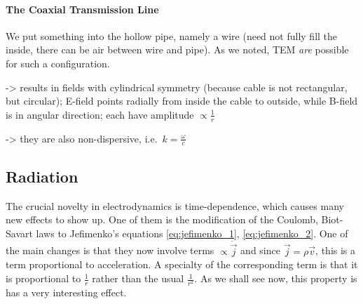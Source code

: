 \documentclass[../class_mech_main.tex]{subfiles}
\begin{document}



            \paragraph{The Coaxial Transmission Line}
We put something into the hollow pipe, namely a wire (need not fully fill the inside, there can be air between wire and pipe). As we noted, TEM \emph{are} possible for such a configuration.

-> results in fields with cylindrical symmetry (because cable is not rectangular, but circular); E-field points radially from inside the cable to outside, while B-field is in angular direction; each have amplitude $\propto \frac{1}{r}$

-> they are also non-dispersive, i.e.~$k = \frac{\omega}{c}$



        \subsection{Radiation}
The crucial novelty in electrodynamics is time-dependence, which causes many new effects to show up. One of them is the modification of the Coulomb, Biot-Savart laws to Jefimenko's equations \eqref{eq:jefimenko_1}, \eqref{eq:jefimenko_2}. One of the main changes is that they now involve terms $\propto \dot{\vec{j}}$ and since $\vec{j} = \rho \vec{v}$, this is a term proportional to acceleration. A specialty of the corresponding term is that it is proportional to $\frac{1}{r}$ rather than the usual $\frac{1}{r^2}$. As we shall see now, this property is has a very interesting effect.
\end{document}
